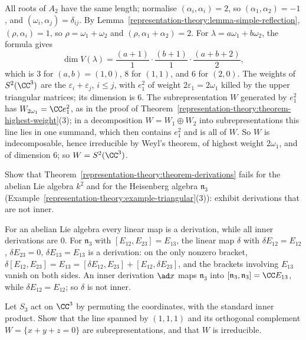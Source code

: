 \begin{solution}
All roots of $A_2$ have the same length; normalise $(\alpha_i, \alpha_i) = 2$, so $(\alpha_1, \alpha_2) = -1$, and $(\omega_i, \alpha_j) = \delta_{ij}$. By
Lemma~\ref{representation-theory:lemma-simple-reflection}, $(\rho, \alpha_i) = 1$, so $\rho = \omega_1 + \omega_2$ and $(\rho, \alpha_1 + \alpha_2) = 2$. For
$\lambda = a\omega_1 + b\omega_2$, the formula gives
\[
\dim V(\lambda) = \frac{(a + 1)}{1}\cdot\frac{(b + 1)}{1}\cdot\frac{(a + b + 2)}{2},
\]
which is $3$ for $(a, b) = (1, 0)$, $8$ for $(1, 1)$, and $6$ for $(2, 0)$. The weights of $S^2(\CC^3)$ are the $\varepsilon_i + \varepsilon_j$, $i \leq j$, with $e_1^2$ of weight
$2\varepsilon_1 = 2\omega_1$ killed by the upper triangular matrices; its dimension is $6$. The subrepresentation $W$ generated by $e_1^2$ has $W_{2\omega_1} = \CC e_1^2$, as in the proof of
Theorem~\ref{representation-theory:theorem-highest-weight}(3); in a decomposition $W = W_1 \oplus W_2$ into subrepresentations this line lies in one summand, which then contains $e_1^2$ and
is all of $W$. So $W$ is indecomposable, hence irreducible by Weyl's theorem, of highest weight $2\omega_1$, and of dimension $6$; so $W = S^2(\CC^3)$.
\end{solution}

\begin{exercise}\label{representation-theory:exercise-derivations-not-inner}
Show that Theorem~\ref{representation-theory:theorem-derivations} fails for the abelian Lie algebra $k^2$ and for the Heisenberg algebra $\mathfrak{n}_3$
(Example~\ref{representation-theory:example-triangular}(3)): exhibit derivations that are not inner.
\end{exercise}

\begin{solution}
For an abelian Lie algebra every linear map is a derivation, while all inner derivations are $0$. For $\mathfrak{n}_3$ with $[E_{12}, E_{23}] = E_{13}$, the linear map $\delta$ with
$\delta E_{12} = E_{12}$, $\delta E_{23} = 0$, $\delta E_{13} = E_{13}$ is a derivation: on the only nonzero bracket, $\delta[E_{12}, E_{23}] = E_{13} = [\delta E_{12}, E_{23}] + [E_{12},
\delta E_{23}]$, and the brackets involving $E_{13}$ vanish on both sides. An inner derivation $\ad x$ maps $\mathfrak{n}_3$ into $[\mathfrak{n}_3, \mathfrak{n}_3] = \CC E_{13}$, while
$\delta E_{12} = E_{12}$; so $\delta$ is not inner.
\end{solution}

\begin{exercise}\label{representation-theory:exercise-unitary-s3}
Let $S_3$ act on $\CC^3$ by permuting the coordinates, with the standard inner product. Show that the line spanned by $(1, 1, 1)$ and its orthogonal complement
$W = \{x + y + z = 0\}$ are subrepresentations, and that $W$ is irreducible.
\end{exercise}

